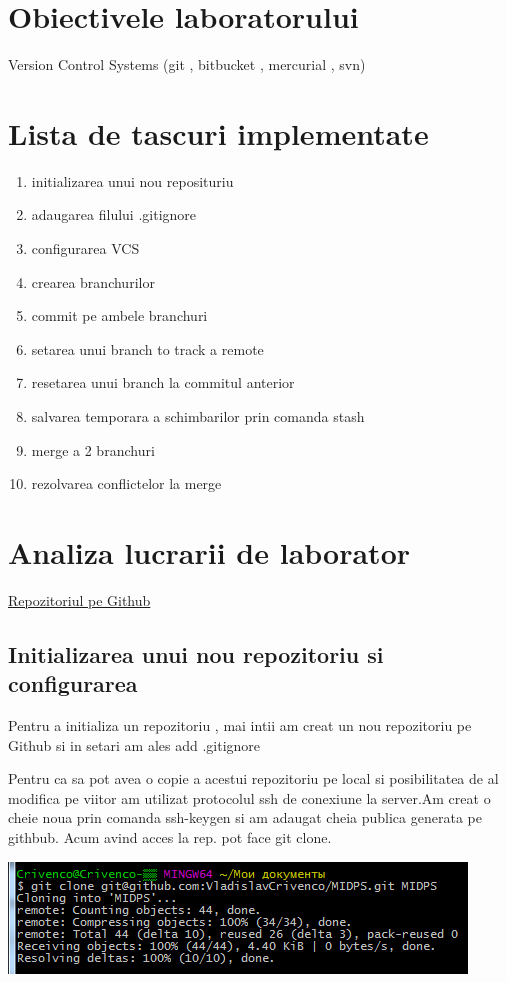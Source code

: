 \documentclass[a4paper, 12pt]{article}
\begin{document}
\section{Obiectivele laboratorului}
Version Control Systems (git , bitbucket , mercurial , svn)

\section{Lista de tascuri implementate}
	\begin{enumerate}
	\item initializarea unui nou reposituriu
	\item adaugarea filului .gitignore
	\item configurarea VCS
	\item crearea branchurilor
	\item commit pe ambele branchuri
	\item setarea unui branch to track a remote 
	\item resetarea unui branch la commitul anterior
	\item salvarea temporara a schimbarilor prin comanda stash
	\item merge a 2 branchuri
	\item rezolvarea conflictelor la merge
	\end{enumerate}

\section{Analiza lucrarii de laborator}
\href{https://github.com/VladislavCrivenco/MIDPS}{Repozitoriul pe Github}

\subsection{Initializarea unui nou repozitoriu si configurarea}

Pentru a initializa un repozitoriu , mai intii am creat un nou repozitoriu pe Github si in setari am ales add .gitignore
 
Pentru ca sa pot avea o copie a acestui repozitoriu pe local si  posibilitatea de al modifica  pe viitor am utilizat protocolul ssh de conexiune la server.Am creat o cheie noua prin comanda ssh-keygen si am adaugat cheia publica generata pe githbub.
Acum avind acces la rep. pot face git clone.

\includegraphics*{git_clone}
\end{document}

